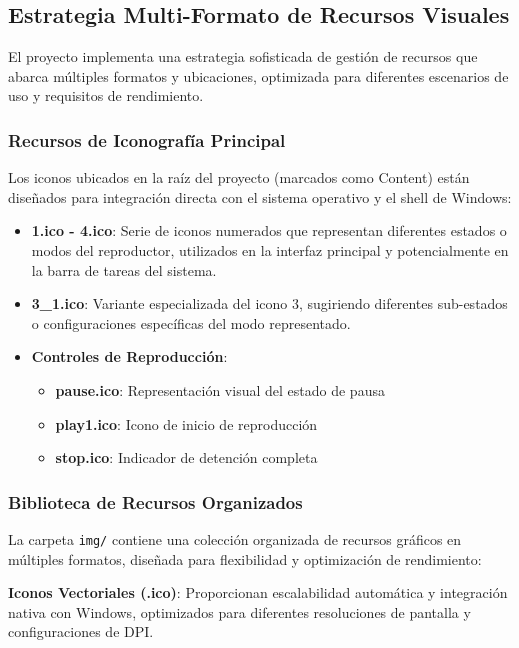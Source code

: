 \documentclass[a4paper]{article}
\begin{document}
\subsection{Estrategia Multi-Formato de Recursos Visuales}

El proyecto implementa una estrategia sofisticada de gestión de recursos que abarca múltiples formatos y ubicaciones, optimizada para diferentes escenarios de uso y requisitos de rendimiento.

\subsubsection{Recursos de Iconografía Principal}

Los iconos ubicados en la raíz del proyecto (marcados como Content) están diseñados para integración directa con el sistema operativo y el shell de Windows:

\begin{itemize}
\item \textbf{1.ico - 4.ico}: Serie de iconos numerados que representan diferentes estados o modos del reproductor, utilizados en la interfaz principal y potencialmente en la barra de tareas del sistema.

\item \textbf{3\_1.ico}: Variante especializada del icono 3, sugiriendo diferentes sub-estados o configuraciones específicas del modo representado.

\item \textbf{Controles de Reproducción}:
\begin{itemize}
\item \textbf{pause.ico}: Representación visual del estado de pausa
\item \textbf{play1.ico}: Icono de inicio de reproducción
\item \textbf{stop.ico}: Indicador de detención completa
\end{itemize}
\end{itemize}

\subsubsection{Biblioteca de Recursos Organizados}

La carpeta \texttt{img/} contiene una colección organizada de recursos gráficos en múltiples formatos, diseñada para flexibilidad y optimización de rendimiento:

\textbf{Iconos Vectoriales (.ico)}:
Proporcionan escalabilidad automática y integración nativa con Windows, optimizados para diferentes resoluciones de pantalla y configuraciones de DPI.
\end{document}
